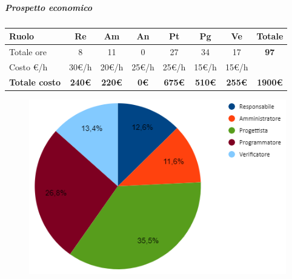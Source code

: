 \subparagraph{Prospetto economico}
\begin{center}
	\renewcommand{\arraystretch}{1.8} %
	\begin{tabular}{ |m{10em}|c|c|c|c|c|c|c| }
	\hline
	\textbf{Ruolo} & \textbf{Re} & \textbf{Am} &  \textbf{An} &  \textbf{Pt} &  \textbf{Pg} &  \textbf{Ve} &  \textbf{Totale}\\
    \hline
    Totale ore & 8 & 11 & 0 & 27 & 34 & 17 & \textbf{97}\\
    \hline
    Costo \euro/h & 30\euro/h & 20\euro/h & 25\euro/h & 25\euro/h & 15\euro/h & 15\euro/h & \\
    \hline
    \textbf{Totale costo} & \textbf{240\euro} & \textbf{220\euro} &  \textbf{0\euro} &  \textbf{675\euro} &  \textbf{510\euro} &  \textbf{255\euro} &  \textbf{1900\euro}\\
    \hline
	\end{tabular}

    \begin{figure}[H]
       \centering\includegraphics{images/preventivo/PB-incremento4-costo.png}
    \end{figure}
\end{center}

\newpage
